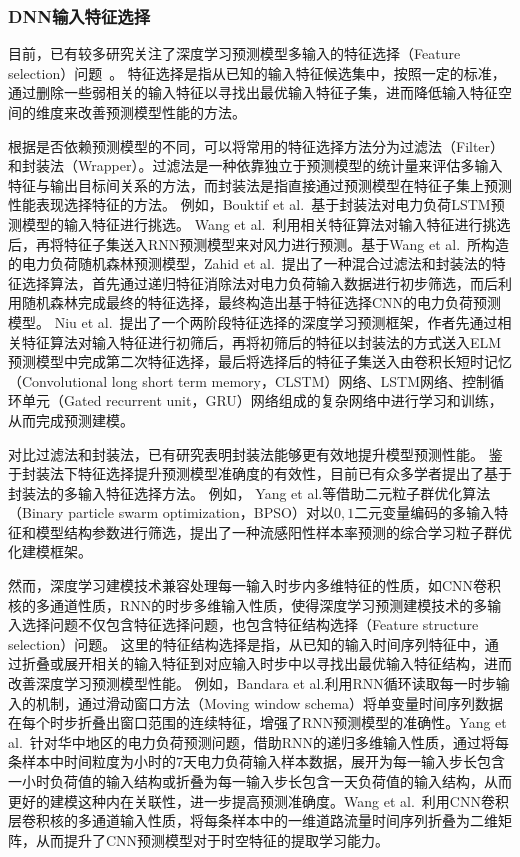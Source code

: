 \subsubsection{DNN输入特征选择}

目前，已有较多研究关注了深度学习预测模型多输入的特征选择（Feature selection）问题~\cite{gaoShortTerm2019,wangNovel2020,niuDeveloping2020}。
特征选择是指从已知的输入特征候选集中，按照一定的标准，通过删除一些弱相关的输入特征以寻找出最优输入特征子集，进而降低输入特征空间的维度来改善预测模型性能的方法。

根据是否依赖预测模型的不同，可以将常用的特征选择方法分为过滤法（Filter）和封装法（Wrapper）。过滤法是一种依靠独立于预测模型的统计量来评估多输入特征与输出目标间关系的方法，而封装法是指直接通过预测模型在特征子集上预测性能表现选择特征的方法。
例如，Bouktif et al.~\cite{bouktifOptimal2018}基于封装法对电力负荷LSTM预测模型的输入特征进行挑选。 Wang et al.~\cite{wangNovel2020}利用相关特征算法对输入特征进行挑选后，再将特征子集送入RNN预测模型来对风力进行预测。基于Wang et al.~\cite{wangRandom2018}所构造的电力负荷随机森林预测模型，Zahid et al.~\cite{zahidElectricity2019}提出了一种混合过滤法和封装法的特征选择算法，首先通过递归特征消除法对电力负荷输入数据进行初步筛选，而后利用随机森林完成最终的特征选择，最终构造出基于特征选择CNN的电力负荷预测模型。
Niu et al.~\cite{niuDeveloping2020}提出了一个两阶段特征选择的深度学习预测框架，作者先通过相关特征算法对输入特征进行初筛后，再将初筛后的特征以封装法的方式送入ELM预测模型中完成第二次特征选择，最后将选择后的特征子集送入由卷积长短时记忆（Convolutional long short term memory，CLSTM）网络、LSTM网络、控制循环单元（Gated recurrent unit，GRU）网络组成的复杂网络中进行学习和训练，从而完成预测建模。

对比过滤法和封装法，已有研究表明封装法能够更有效地提升模型预测性能\cite{huHybrid2015}。
鉴于封装法下特征选择提升预测模型准确度的有效性，目前已有众多学者提出了基于封装法的多输入特征选择方法\cite{renMultivariate2022,naModified2022,wangRandom2018,yangComprehensive2021}。
例如，
Yang et al.\cite{yangComprehensive2021}等借助二元粒子群优化算法（Binary particle swarm optimization，BPSO）对以\(0,1\)二元变量编码的多输入特征和模型结构参数进行筛选，提出了一种流感阳性样本率预测的综合学习粒子群优化建模框架。

然而，深度学习建模技术兼容处理每一输入时步内多维特征的性质，如CNN卷积核的多通道性质，RNN的时步多维输入性质，使得深度学习预测建模技术的多输入选择问题不仅包含特征选择问题，也包含特征结构选择（Feature structure selection）问题。
这里的特征结构选择是指，从已知的输入时间序列特征中，通过折叠或展开相关的输入特征到对应输入时步中以寻找出最优输入特征结构，进而改善深度学习预测模型性能。
例如，Bandara et al.\cite{bandaraForecasting2020}利用RNN循环读取每一时步输入的机制，通过滑动窗口方法（Moving window schema）将单变量时间序列数据在每个时步折叠出窗口范围的连续特征，增强了RNN预测模型的准确性。Yang et al.~\cite{yangShortterm2021}针对华中地区的电力负荷预测问题，借助RNN的递归多维输入性质，通过将每条样本中时间粒度为小时的7天电力负荷输入样本数据，展开为每一输入步长包含一小时负荷值的输入结构或折叠为每一输入步长包含一天负荷值的输入结构，从而更好的建模这种内在关联性，进一步提高预测准确度。Wang et al.~\cite{wangTraffic2016}利用CNN卷积层卷积核的多通道输入性质，将每条样本中的一维道路流量时间序列折叠为二维矩阵，从而提升了CNN预测模型对于时空特征的提取学习能力。

